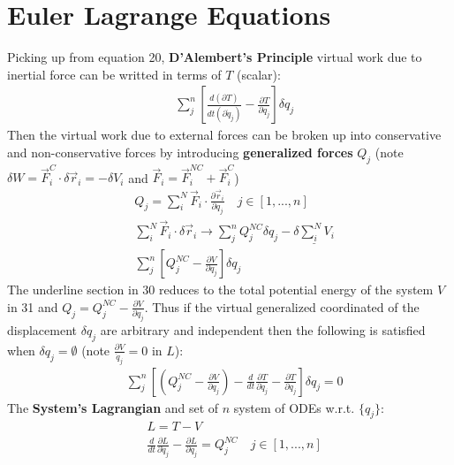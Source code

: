 \documentclass[conference]{IEEEtran}
\begin{document}
\section{Euler Lagrange Equations}
Picking up from equation 20, \textbf{D'Alembert's Principle} virtual work due to inertial force can be writted in terms of $T$ (scalar):
\begin{align}
    & \sum_j^n [\frac{d(\partial T)}{dt(\partial \dot{q}_j)} - \frac{\partial T}{\partial q_j}] \delta q_j
\end{align}
Then the virtual work due to external forces can be broken up into conservative and non-conservative forces by introducing \textbf{generalized forces} $Q_j$ (note $\delta W = \vec{F}_i^C \cdot \delta \vec{r}_i = -\delta V_i$ and $\vec{F}_i = \vec{F}_i^{NC} + \vec{F}_i^C$)
\begin{align}
    & Q_j = \sum_i^N \vec{F}_i \cdot \frac{\partial \vec{r}_i}{\partial q_j} \quad j \in [1, ..., n] \\
    & \sum_i^N \vec{F}_i \cdot \delta \vec{r}_i \to \sum_j^n Q_j^{NC} \delta q_j - \underline{\delta \sum_i^N V_i} \\
    & \sum_j^n[Q_j^{NC} - \frac{\partial V}{\partial q_j}]\delta q_j
\end{align}
The underline section in 30 reduces to the total potential energy of the system $V$ in 31 and $Q_j = Q_j^{NC} - \frac{\partial V}{\partial q_j}$. Thus if the virtual generalized coordinated of the displacement $\delta q_j$ are arbitrary and independent then the following is satisfied when $\delta q_j = \emptyset$ (note $\frac{\partial V}{\dot{q}_j} = 0$ in $L$):
\begin{align}
    & \sum_j^n [(Q_j^{NC} - \frac{\partial V}{\partial q_j}) - \frac{d}{dt}\frac{\partial T}{\partial \dot{q}_j} - \frac{\partial T}{\partial q_j}] \delta q_j = 0
\end{align}
The \textbf{System's Lagrangian} and set of $n$ system  of ODEs w.r.t. $\{q_j\}$:
\begin{align}
    & L = T - V \\
    & \frac{d}{dt}\frac{\partial L}{\partial \dot{q}_j} - \frac{\partial L}{\partial q_j} = Q_j^{NC} \quad j \in [1, ..., n]
\end{align}
\end{document}
